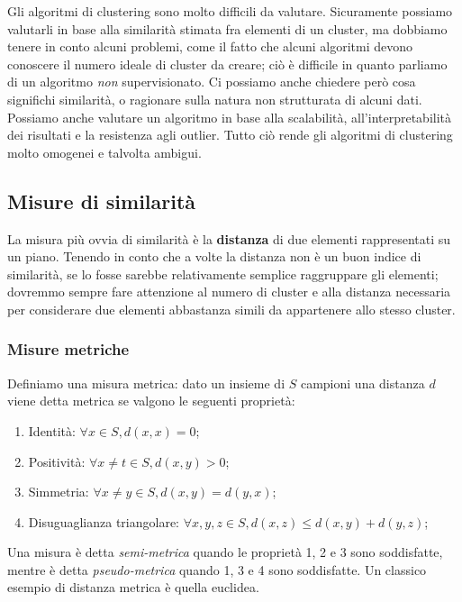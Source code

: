     Gli algoritmi di clustering sono molto difficili da valutare. Sicuramente possiamo valutarli in base alla similarità stimata fra elementi di un cluster, ma dobbiamo tenere in conto alcuni problemi, come il fatto che alcuni algoritmi devono conoscere il numero ideale di cluster da creare; ciò è difficile in quanto parliamo di un algoritmo \textit{non} supervisionato. Ci possiamo anche chiedere però cosa significhi similarità, o ragionare sulla natura non strutturata di alcuni dati. Possiamo anche valutare un algoritmo in base alla scalabilità, all'interpretabilità dei risultati e la resistenza agli outlier. Tutto ciò rende gli algoritmi di clustering molto omogenei e talvolta ambigui.
    
    \subsection{Misure di similarità}
        La misura più ovvia di similarità è la \textbf{distanza} di due elementi rappresentati su un piano. Tenendo in conto che a volte la distanza non è un buon indice di similarità, se lo fosse sarebbe relativamente semplice raggruppare gli elementi; dovremmo sempre fare attenzione al numero di cluster e alla distanza necessaria per considerare due elementi abbastanza simili da appartenere allo stesso cluster.
        
    \subsubsection{Misure metriche}
        Definiamo una misura metrica: dato un insieme di $S$ campioni una distanza $d$ viene detta metrica se valgono le seguenti proprietà:
        \begin{enumerate}
            \item Identità: $\forall x \in S, d(x,x) = 0$;
            \item Positività: $\forall x \neq t \in S, d(x,y) > 0$;
            \item Simmetria: $\forall x \neq y \in S, d(x,y) = d(y,x)$;
            \item Disuguaglianza triangolare: $\forall x,y,z \in S, d(x,z) \leq d(x,y) + d(y,z)$;
        \end{enumerate}
        Una misura è detta \textit{semi-metrica} quando le proprietà 1, 2 e 3 sono soddisfatte, mentre è detta \textit{pseudo-metrica} quando 1, 3 e 4 sono soddisfatte. Un classico esempio di distanza metrica è quella euclidea.
            
